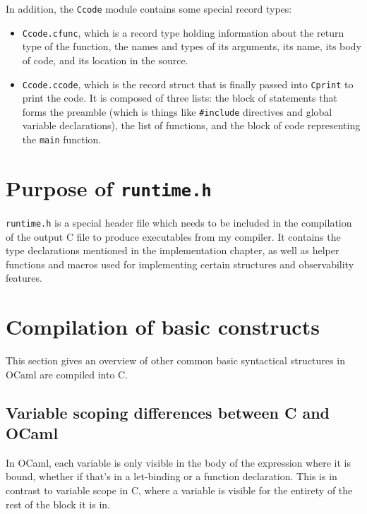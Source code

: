 In addition, the \texttt{Ccode} module contains some special record types:

\begin{itemize}

\item \texttt{Ccode.cfunc}, which is a record type holding information about the
    return type of the function, the names and types of its arguments, its name,
    its body of code, and its location in the source.

\item \texttt{Ccode.ccode}, which is the record struct that is finally passed
    into \texttt{Cprint} to print the code. It is composed of three lists: the
    block of statements that forms the preamble (which is things like
    \texttt{\#}\texttt{include} directives and global variable declarations),
    the list of functions, and the block of code representing the \texttt{main}
    function.

\end{itemize}

\section{Purpose of \texttt{runtime.h}}

\texttt{runtime.h} is a special header file which needs to be included in the
compilation of the output C file to produce executables from my compiler. It
contains the type declarations mentioned in the implementation chapter, as well
as helper functions and macros used for implementing certain structures and
observability features.

\section{Compilation of basic constructs}\label{basic-constructs}

This section gives an overview of other common basic syntactical structures
in OCaml are compiled into C.

\subsection{Variable scoping differences between C and OCaml}\label{variable-scoping}

In OCaml, each variable is only visible in the body of the expression where it
is bound, whether if that's in a let-binding or a function declaration. This is
in contrast to variable scope in C, where a variable is visible for the entirety
of the rest of the block it is in.

